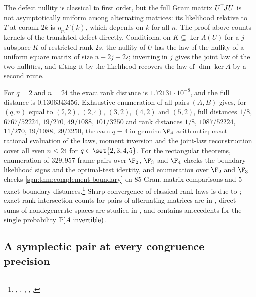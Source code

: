 The defect nullity is classical to first order, but the full Gram matrix $U^{\mathsf{T}}JU$ is not
asymptotically uniform among alternating matrices: its likelihood relative to $T$ at corank $2k$
is $\eta_mF(k)$, which depends on $k$ for all $n$. The proof above counts kernels of the
translated defect directly. Conditional on $K\subseteq\ker\Lambda(U)$ for a $j$-subspace $K$ of
restricted rank $2s$, the nullity of $U$ has the law of the nullity of a uniform square matrix of
size $n-2j+2s$; inverting in $j$ gives the joint law of the two nullities, and tilting it by the
likelihood recovers the law of $\dim\ker A$ by a second route.

For $q=2$ and $n=24$ the exact rank distance is $1.72131\cdot10^{-8}$, and the full
distance is $0.1306343456$. Exhaustive enumeration of all pairs $(A,B)$ gives, for
$(q,n)$ equal to $(2,2)$, $(2,4)$, $(3,2)$, $(4,2)$ and $(5,2)$, full distances $1/8$, $6767/52224$, $19/270$, $49/1088$,
$101/3250$ and rank distances $1/8$, $1087/52224$, $11/270$, $19/1088$, $29/3250$, the case
$q=4$ in genuine $\F_4$ arithmetic; exact rational evaluation of the laws, moment inversion and
the joint-law reconstruction cover all even $n\le24$ for $q\in\set{2,3,4,5}$. For the rectangular
theorems, enumeration of $329{,}957$ frame pairs over $\F_2$, $\F_3$ and $\F_4$ checks the
boundary likelihood signs and the optimal-test identity, and enumeration over $\F_2$ and $\F_3$
checks \cref{spn:thm:complement-boundary} on $85$ Gram-matrix comparisons and $5$ exact boundary
distances.\footnote{\raggedright{},
,
,
,
,
}
Sharp convergence of classical rank laws is due to \cite{Fulman2015Stein}; exact
rank-intersection counts for pairs of alternating matrices are in \cite{PottSchmidtZhou2016Pairs},
direct sums of nondegenerate spaces are studied in \cite{GlasbyNiemeyerPraeger2022Random}, and
\cite{DeBoeckVandeVoorde2024Anzahl} contains antecedents for the single probability
$\mathbb{P}(A\text{ invertible})$.

\subsection{A symplectic pair at every congruence precision}\label{spn:sec:padic}


